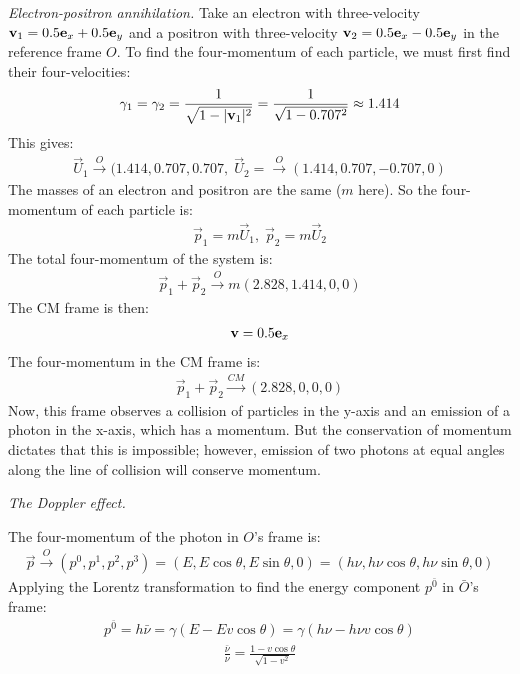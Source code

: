 \documentclass{report}
\begin{document}
\begin{subquests}
	\item \emph{Electron-positron annihilation.}
	Take an electron with three-velocity ${\vb v}_1 = 0.5{\vb e}_x + 0.5{\vb e}_y$ and a positron with three-velocity ${\vb v}_2 = 0.5{\vb e}_x - 0.5{\vb e}_y$ in the reference frame $O$. To find the four-momentum of each particle, we must first find their four-velocities:
	\begin{gather*}
		\gamma_1 = \gamma_2 = \frac{1}{\sqrt{1 - |{\vb v}_1|^2}} = \frac{1}{\sqrt{1 - 0.707^2}} \approx 1.414 
	\end{gather*}
	This gives:
	\begin{gather*}
		\vec U_1 \stackrel{O}\longrightarrow (1.414, 0.707, 0.707, \; \vec U_2 = \stackrel{O}\longrightarrow (1.414, 0.707, -0.707, 0)
	\end{gather*}
	The masses of an electron and positron are the same ($m$ here). So the four-momentum of each particle is:
	\begin{gather*}
		\vec p_1 = m \vec U_1, \; \vec p_2 = m \vec U_2
	\end{gather*} 
	The total four-momentum of the system is:
	\begin{gather*}
		\vec p_1 + \vec p_2 \stackrel{O}\longrightarrow m(2.828, 1.414, 0, 0)
	\end{gather*}
	The CM frame is then:
	\begin{gather*}
		{\vb v} = 0.5{\vb e}_x
	\end{gather*}
	The four-momentum in the CM frame is:
	\begin{gather*}
		\vec p_1 + \vec p_2 \stackrel{CM}\longrightarrow (2.828, 0, 0, 0)
	\end{gather*}
	Now, this frame observes a collision of particles in the y-axis and an emission of a photon in the x-axis, which has a momentum. But the conservation of momentum dictates that this is impossible; however, emission of two photons at equal angles along the line of collision will conserve momentum.

	\item \emph{The Doppler effect.}
	\begin{subquests}
		\item
		The four-momentum of the photon in $O$'s frame is:
		\begin{gather*}
			\vec p \stackrel{O}\longrightarrow (p^0, p^1, p^2, p^3) = (E, E\cos\theta, E\sin\theta, 0) =(h\nu, h\nu\cos\theta, h\nu\sin\theta, 0)
		\end{gather*}
		Applying the Lorentz transformation to find the energy component $p^{\bar 0}$ in $\bar O$'s frame:
		\begin{gather*}
			p^{\bar 0} = h{\bar \nu} = \gamma(E - Ev\cos\theta) = \gamma(h\nu - h\nu v\cos\theta)
		\end{gather*}
		\begin{gather*}
			\frac{\bar \nu}{\nu} = \frac{1 - v\cos\theta}{\sqrt{1-v^2}}
		\end{gather*}
		

\end{subquests}
\end{subquests}
\end{document}
